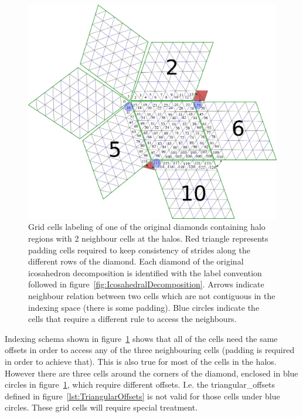 \documentclass{book}
\begin{document}
\begin{figure}[htb!]
	\begin{center}
		\includegraphics[width=18cm]{fig/IcosahedralGridCellHalos.png}
		\caption{Grid cells labeling of one of the original diamonds containing
	halo regions with 2 neighbour cells at the halos. 
	Red triangle represents padding cells required to keep consistency of strides
	along the different rows of the diamond. Each diamond of the original icosahedron 
	decomposition is identified with the label convention followed in figure~\ref{fig:IcosahedralDecomposition}.
	Arrows indicate neighbour relation between two cells which are not contiguous in the indexing space (there is some padding).
	Blue circles indicate the cells that require a different rule to access the neighbours.
	}
	\label{fig:IcosahedralDiamondWithHalos}
	\end{center}
\end{figure}

Indexing schema shown in figure~\ref{fig:IcosahedralDiamondWithHalos} shows that all of the cells need the same offsets in order to access any of the three neighbouring cells (padding is required in order to achieve that). This is also true for most of the cells in the halos. 
However there are three cells around the corners of the diamond, enclosed in blue circles in figure~\ref{fig:IcosahedralDiamondWithHalos}, 
which require different offsets. I.e. the triangular\_offsets defined in figure~\ref{lst:TriangularOffsets} is not valid for those cells under blue circles. These grid cells will require special treatment.
 
\end{document}
